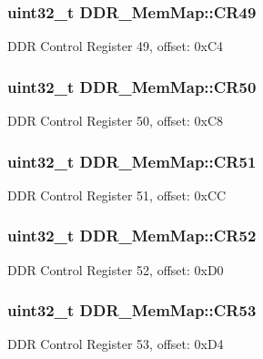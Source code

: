 \subsubsection[{C\+R49}]{\setlength{\rightskip}{0pt plus 5cm}uint32\+\_\+t D\+D\+R\+\_\+\+Mem\+Map\+::\+C\+R49}\label{struct_d_d_r___mem_map_a9d7a9a367fa4fadd78b50661daf91952}
D\+D\+R Control Register 49, offset\+: 0x\+C4 \hypertarget{struct_d_d_r___mem_map_ac8b82633a9d8e06fbe1077ded0597ebe}{}
\subsubsection[{C\+R50}]{\setlength{\rightskip}{0pt plus 5cm}uint32\+\_\+t D\+D\+R\+\_\+\+Mem\+Map\+::\+C\+R50}\label{struct_d_d_r___mem_map_ac8b82633a9d8e06fbe1077ded0597ebe}
D\+D\+R Control Register 50, offset\+: 0x\+C8 \hypertarget{struct_d_d_r___mem_map_a982add3aab22627b6a15f9bc0c056bc5}{}
\subsubsection[{C\+R51}]{\setlength{\rightskip}{0pt plus 5cm}uint32\+\_\+t D\+D\+R\+\_\+\+Mem\+Map\+::\+C\+R51}\label{struct_d_d_r___mem_map_a982add3aab22627b6a15f9bc0c056bc5}
D\+D\+R Control Register 51, offset\+: 0x\+C\+C \hypertarget{struct_d_d_r___mem_map_aab85b60e647d6ff26a53d217b2a63d96}{}
\subsubsection[{C\+R52}]{\setlength{\rightskip}{0pt plus 5cm}uint32\+\_\+t D\+D\+R\+\_\+\+Mem\+Map\+::\+C\+R52}\label{struct_d_d_r___mem_map_aab85b60e647d6ff26a53d217b2a63d96}
D\+D\+R Control Register 52, offset\+: 0x\+D0 \hypertarget{struct_d_d_r___mem_map_ac39ce4b302b098a39cf483811b2dd7ee}{}
\subsubsection[{C\+R53}]{\setlength{\rightskip}{0pt plus 5cm}uint32\+\_\+t D\+D\+R\+\_\+\+Mem\+Map\+::\+C\+R53}\label{struct_d_d_r___mem_map_ac39ce4b302b098a39cf483811b2dd7ee}
D\+D\+R Control Register 53, offset\+: 0x\+D4 \hypertarget{struct_d_d_r___mem_map_a0b6344d64165c3f2360510501654e1da}{}
